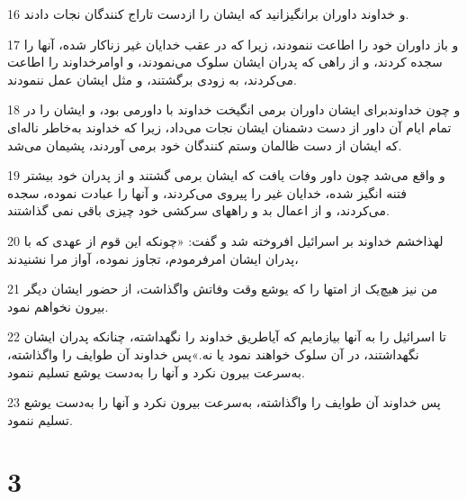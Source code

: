 \par 16 و خداوند داوران برانگیزانید که ایشان را ازدست تاراج کنندگان نجات دادند.
\par 17 و باز داوران خود را اطاعت ننمودند، زیرا که در عقب خدایان غیر زناکار شده، آنها را سجده کردند، و از راهی که پدران ایشان سلوک می‌نمودند، و اوامرخداوند را اطاعت می‌کردند، به زودی برگشتند، و مثل ایشان عمل ننمودند.
\par 18 و چون خداوندبرای ایشان داوران برمی انگیخت خداوند با داورمی بود، و ایشان را در تمام ایام آن داور از دست دشمنان ایشان نجات می‌داد، زیرا که خداوند به‌خاطر ناله‌ای که ایشان از دست ظالمان وستم کنندگان خود برمی آوردند، پشیمان می‌شد.
\par 19 و واقع می‌شد چون داور وفات یافت که ایشان برمی گشتند و از پدران خود بیشتر فتنه انگیز شده، خدایان غیر را پیروی می‌کردند، و آنها را عبادت نموده، سجده می‌کردند، و از اعمال بد و راههای سرکشی خود چیزی باقی نمی گذاشتند.
\par 20 لهذاخشم خداوند بر اسرائیل افروخته شد و گفت: «چونکه این قوم از عهدی که با پدران ایشان امرفرمودم، تجاوز نموده، آواز مرا نشنیدند،
\par 21 من نیز هیچ‌یک از امتها را که یوشع وقت وفاتش واگذاشت، از حضور ایشان دیگر بیرون نخواهم نمود.
\par 22 تا اسرائیل را به آنها بیازمایم که آیاطریق خداوند را نگهداشته، چنانکه پدران ایشان نگهداشتند، در آن سلوک خواهند نمود یا نه.»پس خداوند آن طوایف را واگذاشته، به‌سرعت بیرون نکرد و آنها را به‌دست یوشع تسلیم ننمود.
\par 23 پس خداوند آن طوایف را واگذاشته، به‌سرعت بیرون نکرد و آنها را به‌دست یوشع تسلیم ننمود.
 
\chapter{3}

